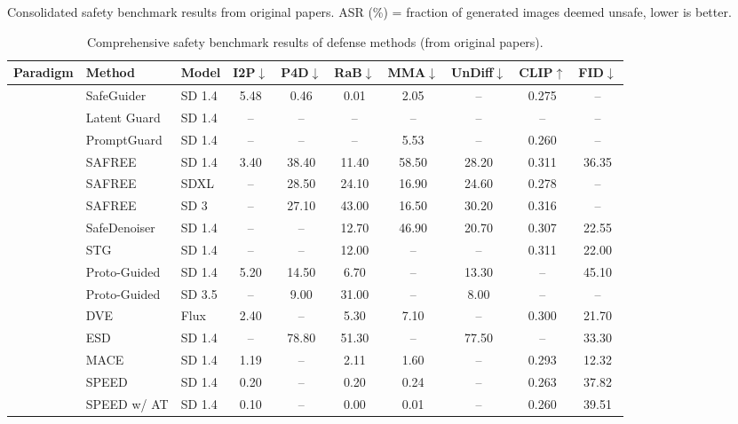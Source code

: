 \documentclass[11pt,a4paper]{article}
\begin{document}
Consolidated safety benchmark results from original papers. ASR (\%) = fraction of generated images deemed unsafe, lower is better.

\begin{table}[H]
\centering
\caption{Comprehensive safety benchmark results of defense methods (from original papers).}
\footnotesize
\renewcommand{\arraystretch}{1.2}
\begin{tabular}{@{} l l l c c c c c c c @{}}
\toprule
\textbf{Paradigm} & \textbf{Method} & \textbf{Model} & \textbf{I2P$\downarrow$} & \textbf{P4D$\downarrow$} & \textbf{RaB$\downarrow$} & \textbf{MMA$\downarrow$} & \textbf{UnDiff$\downarrow$} & \textbf{CLIP$\uparrow$} & \textbf{FID$\downarrow$} \\
\midrule
{}
 & SafeGuider & SD 1.4 & 5.48 & 0.46 & 0.01 & 2.05 & -- & 0.275 & -- \\
 & Latent Guard & SD 1.4 & -- & -- & -- & -- & -- & -- & -- \\
 & PromptGuard & SD 1.4 & -- & -- & -- & 5.53 & -- & 0.260 & -- \\
\midrule
{}
 & SAFREE & SD 1.4 & 3.40 & 38.40 & 11.40 & 58.50 & 28.20 & 0.311 & 36.35 \\
 & SAFREE & SDXL & -- & 28.50 & 24.10 & 16.90 & 24.60 & 0.278 & -- \\
 & SAFREE & SD 3 & -- & 27.10 & 43.00 & 16.50 & 30.20 & 0.316 & -- \\
 & SafeDenoiser & SD 1.4 & -- & -- & 12.70 & 46.90 & 20.70 & 0.307 & 22.55 \\
 & STG & SD 1.4 & -- & -- & 12.00 & -- & -- & 0.311 & 22.00 \\
 & Proto-Guided & SD 1.4 & 5.20 & 14.50 & 6.70 & -- & 13.30 & -- & 45.10 \\
 & Proto-Guided & SD 3.5 & -- & 9.00 & 31.00 & -- & 8.00 & -- & -- \\
 & DVE & Flux & 2.40 & -- & 5.30 & 7.10 & -- & 0.300 & 21.70 \\
\midrule
{}
 & ESD & SD 1.4 & -- & 78.80 & 51.30 & -- & 77.50 & -- & 33.30 \\
 & MACE & SD 1.4 & 1.19 & -- & 2.11 & 1.60 & -- & 0.293 & 12.32 \\
 & SPEED & SD 1.4 & 0.20 & -- & 0.20 & 0.24 & -- & 0.263 & 37.82 \\
 & SPEED w/ AT & SD 1.4 & 0.10 & -- & 0.00 & 0.01 & -- & 0.260 & 39.51 \\

\end{tabular}
\end{table}
\end{document}
